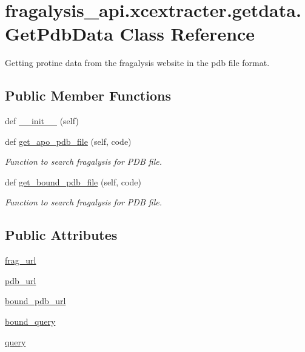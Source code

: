 \hypertarget{classfragalysis__api_1_1xcextracter_1_1getdata_1_1_get_pdb_data}{}\section{fragalysis\+\_\+api.\+xcextracter.\+getdata.\+Get\+Pdb\+Data Class Reference}
\label{classfragalysis__api_1_1xcextracter_1_1getdata_1_1_get_pdb_data}


Getting protine data from the fragalysis website in the pdb file format.  


\subsection*{Public Member Functions}
\begin{DoxyCompactItemize}
\item 
def \hyperlink{classfragalysis__api_1_1xcextracter_1_1getdata_1_1_get_pdb_data_abe03d6df71459bf479db778df7122186}{\+\_\+\+\_\+init\+\_\+\+\_\+} (self)
\item 
def \hyperlink{classfragalysis__api_1_1xcextracter_1_1getdata_1_1_get_pdb_data_a1785640f7d8841b41773f04577065366}{get\+\_\+apo\+\_\+pdb\+\_\+file} (self, code)
\begin{DoxyCompactList}\small\item\em Function to search fragalysis for P\+DB file. \end{DoxyCompactList}\item 
def \hyperlink{classfragalysis__api_1_1xcextracter_1_1getdata_1_1_get_pdb_data_afcb12b3a8f39a7d54917eefed0a1b4af}{get\+\_\+bound\+\_\+pdb\+\_\+file} (self, code)
\begin{DoxyCompactList}\small\item\em Function to search fragalysis for P\+DB file. \end{DoxyCompactList}\end{DoxyCompactItemize}
\subsection*{Public Attributes}
\begin{DoxyCompactItemize}
\item 
\hyperlink{classfragalysis__api_1_1xcextracter_1_1getdata_1_1_get_pdb_data_a2cbb80e8804df35ddc3907e128bf5611}{frag\+\_\+url}
\item 
\hyperlink{classfragalysis__api_1_1xcextracter_1_1getdata_1_1_get_pdb_data_a8b6633bc84797be7178323c1ff5d0474}{pdb\+\_\+url}
\item 
\hyperlink{classfragalysis__api_1_1xcextracter_1_1getdata_1_1_get_pdb_data_a1edc9f29f240166dab511937439ab355}{bound\+\_\+pdb\+\_\+url}
\item 
\hyperlink{classfragalysis__api_1_1xcextracter_1_1getdata_1_1_get_pdb_data_a69a3d1dd7ec122a02aff1945b82ee432}{bound\+\_\+query}
\item 
\hyperlink{classfragalysis__api_1_1xcextracter_1_1getdata_1_1_get_pdb_data_ad09eb6782120b4d3114a9e5c3f66f373}{query}
\end{DoxyCompactItemize}



